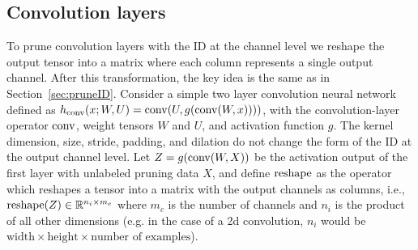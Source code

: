 \subsection{Convolution layers}


To prune convolution layers with the ID at the channel level we reshape the %
output tensor into a matrix where each column represents a single output channel.
After this transformation, the key idea is the same as in Section~\ref{sec:pruneID}.
Consider a simple two layer convolution neural network defined as 
$%
    h_{\Conv}(x; W, U)
    =
    \Conv(U, g( \Conv(W, x))))
$, %
with the convolution-layer operator $\operatorname{conv}$, weight tensors $W$ and $U$,
and activation function $g$.
The kernel dimension, size, stride, padding, and dilation do not change the form of the ID at the output channel level.
Let $Z = g(\operatorname{conv}(W, X))$ be the activation output of the first layer with unlabeled pruning data $X$, and define $\operatorname{reshape}$ as the operator which reshapes a tensor into a matrix with the output channels as columns, i.e., $\operatorname{reshape}(Z)\in\mathbb{R}^{n_i\times m_c}$ where $m_c$ is the number of channels and $n_i$ is the product of all other dimensions (e.g. in the case of a 2d convolution, $n_i$ would be $\text{width} \times \text{height} \times \text{number of examples}$). 

